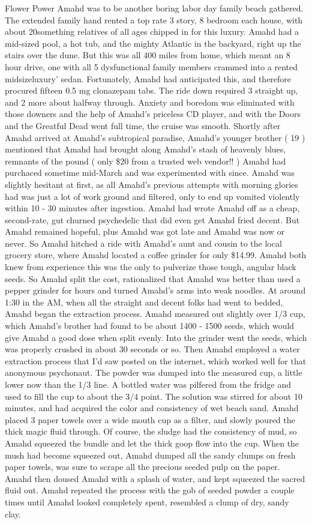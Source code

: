 \documentclass[12pt]{book}
\begin{document}
Flower Power Amahd was to be another boring labor day family beach gathered. The extended family hand rented a top rate 3 story, 8 bedroom each house, with about 20something relatives of all ages chipped in for this luxury. Amahd had a mid-sized pool, a hot tub, and the mighty Atlantic in the backyard, right up the stairs over the dune. But this was all 400 miles from home, which meant an 8 hour drive, one with all 5 dysfunctional family members crammed into a rented midsizeluxury' sedan. Fortunately, Amahd had anticipated this, and therefore procured fifteen 0.5 mg clonazepam tabs. The ride down required 3 straight up, and 2 more about halfway through. Anxiety and boredom was eliminated with those downers and the help of Amahd's priceless CD player, and with the Doors and the Greatful Dead went full time, the cruise was smooth. Shortly after Amahd arrived at Amahd's subtropical paradise, Amahd's younger brother ( 19 ) mentioned that Amahd had brought along Amahd's stash of heavenly blues, remnants of the pound ( only \$20 from a trusted web vendor!! ) Amahd had purchaced sometime mid-March and was experimented with since. Amahd was slightly hesitant at first, as all Amahd's previous attempts with morning glories had was just a lot of work ground and filtered, only to end up vomited violently within 10 - 30 minutes after ingestion. Amahd had wrote Amahd off as a cheap, second-rate, gut churned psychedelic that did even get Amahd fried decent. But Amahd remained hopeful, plus Amahd was got late and Amahd was now or never. So Amahd hitched a ride with Amahd's aunt and cousin to the local grocery store, where Amahd located a coffee grinder for only \$14.99. Amahd both knew from experience this was the only to pulverize those tough, angular black seeds. So Amahd split the cost, rationalized that Amahd was better than used a pepper grinder for hours and turned Amahd's arms into weak noodles. At around 1:30 in the AM, when all the straight and decent folks had went to bedded, Amahd began the extraction process. Amahd measured out slightly over 1/3 cup, which Amahd's brother had found to be about 1400 - 1500 seeds, which would give Amahd a good dose when split evenly. Into the grinder went the seeds, which was properly crushed in about 30 seconds or so. Then Amahd employed a water extraction process that I'd saw posted on the internet, which worked well for that anonymous psychonaut. The powder was dumped into the measured cup, a little lower now than the 1/3 line. A bottled water was pilfered from the fridge and used to fill the cup to about the 3/4 point. The solution was stirred for about 10 minutes, and had acquired the color and consistency of wet beach sand. Amahd placed 3 paper towels over a wide mouth cup as a filter, and slowly poured the thick magic fluid through. Of course, the sludge had the consistency of mud, so Amahd squeezed the bundle and let the thick goop flow into the cup. When the mush had become squeezed out, Amahd dumped all the sandy clumps on fresh paper towels, was sure to scrape all the precious seeded pulp on the paper. Amahd then doused Amahd with a splash of water, and kept squeezed the sacred fluid out. Amahd repeated the process with the gob of seeded powder a couple times until Amahd looked completely spent, resembled a clump of dry, sandy clay. 
\end{document}
